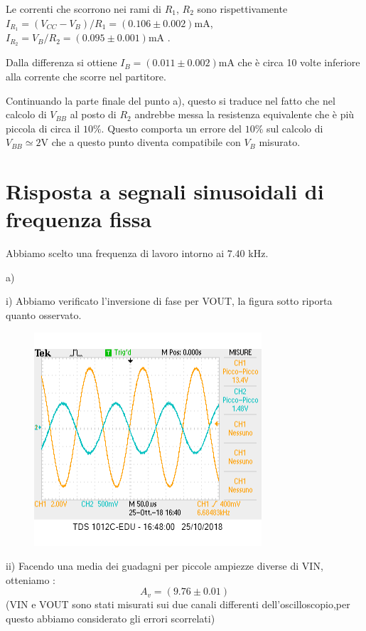 \documentclass[10pt,a4paper]{article}
\begin{document}
Le correnti che scorrono nei rami di $R_1$, $R_2$ sono rispettivamente $I_{R_1} = (V_{CC}-V_{B})/R_1 = (0.106\pm 0.002)\si{\milli\ampere}  $, $I_{R_2} = V_{B}/R_2=(0.095\pm 0.001)\si{\milli\ampere} $ .

Dalla differenza si ottiene $I_B = (0.011\pm 0.002) \si{\milli\ampere} $ che è circa 10 volte inferiore alla corrente che scorre nel partitore.

Continuando la parte finale del punto a), questo si traduce nel fatto che nel calcolo di $V_{BB}$ al posto di $R_2 $ andrebbe messa la resistenza equivalente che è più piccola di circa il $10\%$. Questo comporta un errore del $10\% $ sul calcolo di $V_{BB}\simeq 2\si{\volt}$ che a questo punto diventa compatibile con $V_{B}$ misurato.



\section{Risposta a segnali sinusoidali di frequenza fissa}

Abbiamo scelto una frequenza di lavoro intorno ai $7.40$ \si{\kilo\hertz}.

a) 
\vspace{0.5cm}

i)  Abbiamo verificato l'inversione di fase per VOUT, la figura sotto riporta quanto osservato.

\begin{figure}[h]
	\centering
	\includegraphics[scale=0.7]{oscilloscopio.png}

	
	
\end{figure}

ii)  Facendo una media dei guadagni per piccole  ampiezze diverse di VIN, otteniamo :\[A_v= (9.76\pm0.01) \]
  (VIN e VOUT sono stati misurati sui due canali differenti dell'oscilloscopio,per questo abbiamo considerato gli errori scorrelati)
\end{document}
